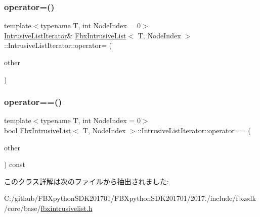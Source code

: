 \subsubsection{\texorpdfstring{operator=()}{operator=()}}
{\footnotesize\ttfamily template$<$typename T, int Node\+Index = 0$>$ \\
\hyperlink{class_fbx_intrusive_list_1_1_intrusive_list_iterator}{Intrusive\+List\+Iterator}\& \hyperlink{class_fbx_intrusive_list}{Fbx\+Intrusive\+List}$<$ T, Node\+Index $>$\+::Intrusive\+List\+Iterator\+::operator= (\begin{DoxyParamCaption}\item[{const \hyperlink{class_fbx_intrusive_list_1_1_intrusive_list_iterator}{Intrusive\+List\+Iterator} \&}]{other }\end{DoxyParamCaption})}

\mbox{\label{class_fbx_intrusive_list_1_1_intrusive_list_iterator_a5d1689422d59c3ed59daeacb687b7a24}} 
\subsubsection{\texorpdfstring{operator==()}{operator==()}}
{\footnotesize\ttfamily template$<$typename T, int Node\+Index = 0$>$ \\
bool \hyperlink{class_fbx_intrusive_list}{Fbx\+Intrusive\+List}$<$ T, Node\+Index $>$\+::Intrusive\+List\+Iterator\+::operator== (\begin{DoxyParamCaption}\item[{const \hyperlink{class_fbx_intrusive_list_1_1_intrusive_list_iterator}{Intrusive\+List\+Iterator} \&}]{other }\end{DoxyParamCaption}) const}



このクラス詳解は次のファイルから抽出されました\+:\begin{DoxyCompactItemize}
\item 
C\+:/github/\+F\+B\+Xpython\+S\+D\+K201701/\+F\+B\+Xpython\+S\+D\+K201701/2017./include/fbxsdk/core/base/\hyperlink{fbxintrusivelist_8h}{fbxintrusivelist.\+h}\end{DoxyCompactItemize}
